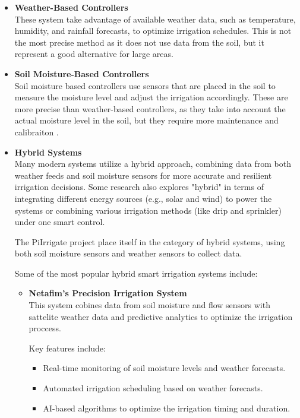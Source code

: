 \begin{itemize}
  \item \textbf{Weather-Based Controllers} \\
  These system take advantage of available weather data, such as temperature, 
  humidity, and rainfall forecasts, to optimize irrigation schedules. This is not the
  most precise method as it does not use data from the soil, but it represent a good alternative
  for large areas.

  \item \textbf{Soil Moisture-Based Controllers} \\
  Soil moisture based controllers use sensors that are placed in the soil to measure
  the moisture level and adjust the irrigation accordingly.
  These are more precise than weather-based controllers, as they take into account
  the actual moisture level in the soil, but they require more maintenance and calibraiton
  \cite{smartIrrigationTechnologyControllersAndSensors}.

  \item \textbf{Hybrid Systems} \\
  Many modern systems utilize a hybrid approach, combining data from both
  weather feeds and soil moisture sensors for more accurate and resilient 
  irrigation decisions. Some research also explores "hybrid" in terms of 
  integrating different energy sources (e.g., solar and wind) to power the systems or 
  combining various 
  irrigation methods (like drip and sprinkler) under one smart control\cite{soilBasedIrrigation}.

  The PiIrrigate project place itself in the category of hybrid systems, using both
  soil moisture sensors and weather sensors to collect data.
  
  Some of the most popular hybrid smart irrigation systems include:
  \begin{itemize}
    \item \textbf{Netafim's Precision Irrigation System} \\
    This system cobines data from soil moisture and flow sensors with sattelite weather data and predictive
    analytics to optimize the irrigation proccess.
    
    Key features include:
    \begin{itemize}
      \item Real-time monitoring of soil moisture levels and weather forecasts.
      \item Automated irrigation scheduling based on weather forecasts.
      \item AI-based algorithms to optimize the irrigation timing and duration.
    \end{itemize}


\end{itemize}
\end{itemize}
